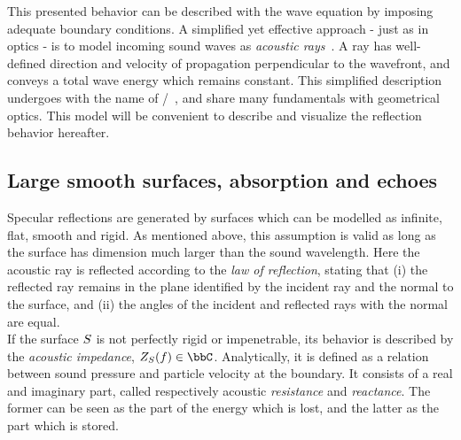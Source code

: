 \mynewline
This presented behavior can be described with the wave equation by imposing adequate boundary conditions.
A simplified yet effective approach - just as in optics - is to model incoming sound waves as \textit{acoustic rays}~.
A ray has well-defined direction and velocity of propagation perpendicular to the wavefront, and conveys a total wave energy which remains constant.
This simplified description undergoes with the name of \GAdef/~, and share many fundamentals with geometrical optics.
This model will be convenient to describe and visualize the reflection behavior hereafter.

\subsection{Large smooth surfaces, absorption and echoes}\label{subsec:acoustics:reflection}
Specular reflections are generated by surfaces which can be modelled as infinite, flat, smooth and rigid.
As mentioned above, this assumption is valid as long as the surface has dimension much larger than the sound wavelength.
Here the acoustic ray is reflected according to the \textit{law of reflection}, stating that
(i) the reflected ray remains in the plane identified by the incident ray and the normal to the surface,
and (ii) the angles of the incident and reflected rays with the normal are equal.
\\If the surface $S$ is not perfectly rigid or impenetrable, its behavior is described by the \textit{acoustic impedance}, $\impedence_\surface(f) \in \bbC$.
Analytically, it is defined as a relation between sound pressure and particle velocity at the boundary.
It consists of a real and imaginary part, called respectively acoustic \textit{resistance} and \textit{reactance}.
The former can be seen as the part of the energy which is lost, and the latter as the part which is stored.

